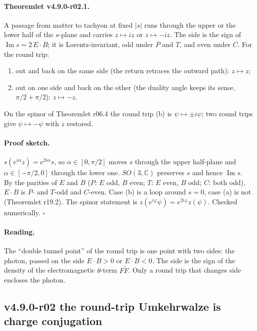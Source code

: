 \paragraph{Theoremlet v4.9.0-r02.1.}
A passage from matter to tachyon at fixed \(|s|\) runs through the upper or the lower half of the \(s\)-plane and carries
\(z\mapsto iz\) or \(z\mapsto -iz\).  The side is the sign of \(\operatorname{Im}s=2\,E\cdot B\); it is Lorentz-invariant,
odd under \(P\) and \(T\), and even under \(C\).  For the round trip:
\begin{enumerate}[leftmargin=2em]
\item[(a)] out and back on the same side (the return retraces the outward path): \(z\mapsto z\);
\item[(b)] out on one side and back on the other (the duality angle keeps its sense, \(\pi/2+\pi/2\)): \(z\mapsto -z\).
\end{enumerate}
On the spinor of Theoremlet r06.4 the round trip (b) is \(\psi\mapsto\pm i\psi\); two round trips give
\(\psi\mapsto-\psi\) with \(z\) restored.

\paragraph{Proof sketch.}
\(s(e^{i\alpha}z)=e^{2i\alpha}s\), so \(\alpha\in[0,\pi/2]\) moves \(s\) through the upper half-plane and
\(\alpha\in[-\pi/2,0]\) through the lower one.  \(SO(3,\mathbb C)\) preserves \(s\) and hence \(\operatorname{Im}s\).  By the
parities of \(E\) and \(B\) (\(P\): \(E\) odd, \(B\) even; \(T\): \(E\) even, \(B\) odd; \(C\): both odd), \(E\cdot B\) is
\(P\)- and \(T\)-odd and \(C\)-even.  Case (b) is a loop around \(s=0\), case (a) is not (Theoremlet r19.2).  The spinor
statement is \(z(e^{i\varphi}\psi)=e^{2i\varphi}z(\psi)\).  Checked numerically.  \(\square\)

\paragraph{Reading.}
The ``double tunnel point'' of the round trip is one point with two sides: the photon, passed on the side
\(E\cdot B>0\) or \(E\cdot B<0\).  The side is the sign of the density of the electromagnetic \(\theta\)-term
\(F\tilde F\).  Only a round trip that changes side encloses the photon.

\subsection*{v4.9.0-r02 the round-trip Umkehrwalze is charge conjugation}
\label{subsec:v490-r02-charge-conjugation}

